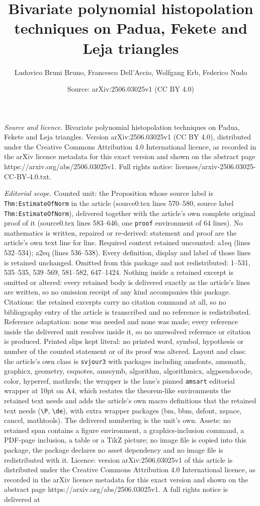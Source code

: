\documentclass[10pt,a4paper]{amsart}
\title[Bivariate polynomial histopolation techniques on Padua, Feke]{Bivariate polynomial histopolation techniques on Padua, Fekete and Leja triangles}
\author{Ludovico Bruni Bruno, Francesco Dell'Accio, Wolfgang Erb, Federico Nudo}
\date{Source: arXiv:2506.03025v1 (CC BY 4.0)}
\begin{document}
\maketitle

\noindent\emph{Source and licence.} Bivariate polynomial histopolation techniques on Padua, Fekete and Leja triangles. Version arXiv:2506.03025v1 (CC BY 4.0), distributed under the Creative Commons Attribution 4.0 International licence, as recorded in the arXiv licence metadata for this exact version and shown on the abstract page https://arxiv.org/abs/2506.03025v1. Full rights notice: licenses/arxiv-2506.03025-CC-BY-4.0.txt.\par\smallskip

\noindent\textit{Editorial scope.} Counted unit: the Proposition whose source label is \texttt{Thm:EstimateOfNorm} in the article (source0.tex lines 570--580, source label \texttt{Thm:EstimateOfNorm}), delivered together with the article's own complete original proof of it (source0.tex lines 583--646, one \texttt{proof} environment of 64 lines). No mathematics is written, repaired or re-derived: statement and proof are the article's own text line for line. Required context retained uncounted: a1eq (lines 532--534); a2eq (lines 536--538). Every definition, display and label of those lines is retained unchanged. Omitted from this package and not redistributed: 1--531, 535--535, 539--569, 581--582, 647--1424. Nothing inside a retained excerpt is omitted or altered: every retained body is delivered exactly as the article's lines are written, so no omission receipt of any kind accompanies this package. Citations: the retained excerpts carry no citation command at all, so no bibliography entry of the article is transcribed and no reference is redistributed. Reference adaptation: none was needed and none was made; every reference inside the delivered unit resolves inside it, so no unresolved reference or citation is produced. Printed slips kept literal: no printed word, symbol, hypothesis or number of the counted statement or of its proof was altered. Layout and class: the article's own class is \texttt{svjour3} with packages including amsfonts, amsmath, graphicx, geometry, csquotes, amssymb, algorithm, algorithmicx, algpseudocode, color, hyperref, mathrsfs; the wrapper is the lane's pinned \texttt{amsart} editorial wrapper at 10pt on A4, which restates the theorem-like environments the retained text needs and adds the article's own macro definitions that the retained text needs (\texttt{\textbackslash P}, \texttt{\textbackslash de}), with extra wrapper packages (bm, bbm, dsfont, xspace, cancel, mathtools). The delivered numbering is the unit's own. Assets: no retained span contains a figure environment, a graphics-inclusion command, a PDF-page inclusion, a table or a TikZ picture; no image file is copied into this package, the package declares no asset dependency and no image file is redistributed with it. Licence: version arXiv:2506.03025v1 of this article is distributed under the Creative Commons Attribution 4.0 International licence, as recorded in the arXiv licence metadata for this exact version and shown on the abstract page https://arxiv.org/abs/2506.03025v1. A full rights notice is delivered at 
\end{document}
